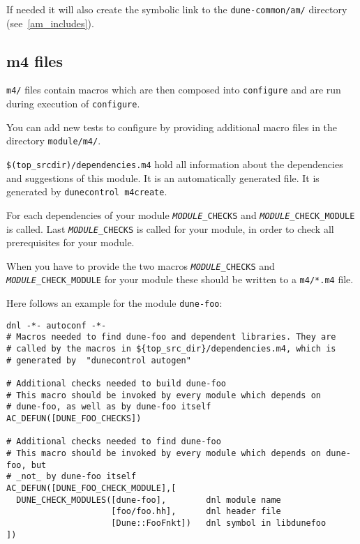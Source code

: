 \documentclass[11pt,a4paper,headinclude,footinclude,DIV16,normalheadings]{scrartcl}
\newcommand{\configure}{\texttt{configure}\xspace}
\newcommand{\topsrc}{\$(top\_srcdir)}
\begin{document}
If needed it will also create the symbolic link to the
\texttt{dune-common/am/} directory (see~\ref{am_includes}).

\subsection{m4 files}
\label{m4files}

\texttt{m4/} files contain macros which are then composed into
\configure and are run during execution of \configure.


You can add new tests to configure by providing additional macro files
in the directory \texttt{module/m4/}.


\texttt{\topsrc/dependencies.m4} hold all information about the
dependencies and suggestions of this module. It is an automatically
generated file. It is generated by \texttt{dunecontrol m4create}.

For each dependencies of your module \texttt{\emph{MODULE}\_CHECKS}
and \texttt{\emph{MODULE}\_CHECK\_MODULE} is called. Last
\texttt{\emph{MODULE}\_CHECKS} is called for your module, in order to
check all prerequisites for your module.

When you have to provide the two macros
\texttt{\emph{MODULE}\_CHECKS} and
\texttt{\emph{MODULE}\_CHECK\_MODULE} for your module these should be
written to a \texttt{m4/*.m4} file.

Here follows an example for the module \texttt{dune-foo}:

\begin{lstlisting}
dnl -*- autoconf -*-
# Macros needed to find dune-foo and dependent libraries. They are
# called by the macros in ${top_src_dir}/dependencies.m4, which is
# generated by  "dunecontrol autogen"

# Additional checks needed to build dune-foo
# This macro should be invoked by every module which depends on
# dune-foo, as well as by dune-foo itself
AC_DEFUN([DUNE_FOO_CHECKS])

# Additional checks needed to find dune-foo
# This macro should be invoked by every module which depends on dune-foo, but
# _not_ by dune-foo itself
AC_DEFUN([DUNE_FOO_CHECK_MODULE],[
  DUNE_CHECK_MODULES([dune-foo],        dnl module name
                     [foo/foo.hh],      dnl header file
                     [Dune::FooFnkt])   dnl symbol in libdunefoo
])
\end{lstlisting}
\end{document}
